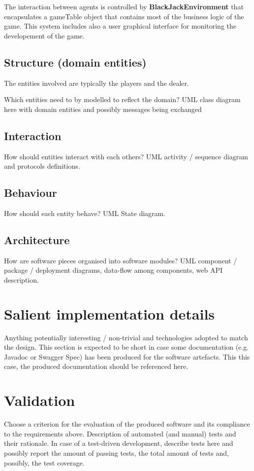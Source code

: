 The interaction between agents is controlled by \textbf{BlackJackEnvironment} that encapsulates a gameTable object that contains most of the business logic of the game. This system includes also a user graphical interface for monitoring the developement of the game.

\section{Structure (domain entities)}
The entities involved are typically the players and the dealer.




Which entities need to by modelled to reflect the domain? UML class diagram here with
domain entities and possibly messages being exchanged

\section{Interaction}
How should entities interact with each others? UML activity / sequence diagram and
protocols definitions.

\section{Behaviour}
How should each entity behave? UML State diagram.

\section{Architecture}
How are software pieces organised into software modules? UML component / package /
deployment diagrams, data-flow among components, web API description.


\chapter{Salient implementation details}
Anything potentially interesting / non-trivial and technologies adopted to match the
design. This section is expected to be short in case some documentation (e.g. Javadoc
or Swagger Spec) has been produced for the software artefacts. This this case, the
produced documentation should be referenced here.

\chapter{Validation}
Choose a criterion for the evaluation of the produced software and its compliance
to the requirements above. Description of automated (and manual) tests and their
rationale. In case of a test-driven development, describe tests here and possibly report
the amount of passing tests, the total amount of tests and, possibly, the test coverage.

